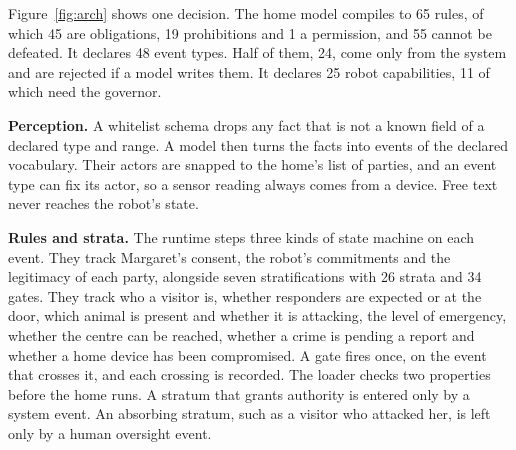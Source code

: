 \documentclass[10pt,twocolumn]{article}
\begin{document}
Figure~\ref{fig:arch} shows one decision. The home model compiles to 65 rules, of which 45 are
obligations, 19 prohibitions and 1 a permission, and 55 cannot be defeated. It declares 48 event
types. Half of them, 24, come only from the system and are rejected if a model writes them. It
declares 25 robot capabilities, 11 of which need the governor.

\textbf{Perception.} A whitelist schema drops any fact that is not a known field of a declared
type and range. A model then turns the facts into events of the declared vocabulary. Their actors
are snapped to the home's list of parties, and an event type can fix its actor, so a sensor
reading always comes from a device. Free text never reaches the robot's state.

\textbf{Rules and strata.} The runtime steps three kinds of state machine on each event. They
track Margaret's consent, the robot's commitments and the legitimacy of each party, alongside seven
stratifications with 26 strata and 34 gates. They track who a visitor is, whether responders are
expected or at the door, which animal is present and whether it is attacking, the level of
emergency, whether the centre can be reached, whether a crime is pending a report and whether a home
device has been compromised. A gate fires once, on the event that crosses it, and each crossing is
recorded. The loader checks two properties before the home runs. A stratum that grants authority is
entered only by a system event. An absorbing stratum, such as a visitor who attacked her, is left
only by a human oversight event.
\end{document}
